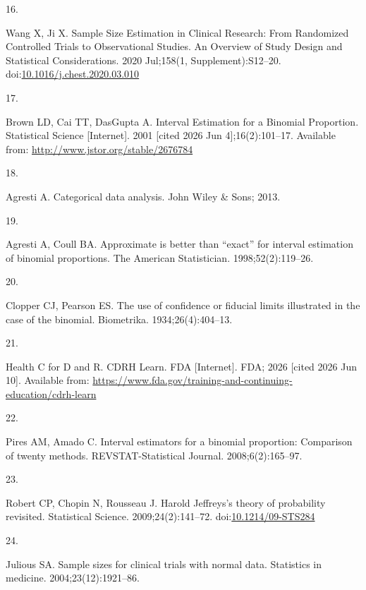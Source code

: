 \documentclass{article}
\newlength{\cslhangindent}
\newlength{\csllabelwidth}
\newenvironment{CSLReferences}[2] %
 {\begin{list}{}{%
  \setlength{\itemindent}{0pt}
  \setlength{\leftmargin}{0pt}
  \setlength{\parsep}{0pt}
  \ifodd #1
   \setlength{\leftmargin}{\cslhangindent}
   \setlength{\itemindent}{-1\cslhangindent}
  \fi
  \setlength{\itemsep}{#2\baselineskip}}}
 {\end{list}}
\newcommand{\CSLLeftMargin}[1]{\parbox[t]{\csllabelwidth}{#1}}
\newcommand{\CSLRightInline}[1]{\parbox[t]{\linewidth - \csllabelwidth}{#1}\break}
\begin{document}
\begin{CSLReferences}{0}{1}
\CSLLeftMargin{16. }%
\CSLRightInline{Wang X, Ji X. Sample {Size} {Estimation} in {Clinical}
{Research}: {From} {Randomized} {Controlled} {Trials} to {Observational}
{Studies}. An Overview of Study Design and Statistical Considerations.
2020 Jul;158(1, Supplement):S12--20.
doi:\href{https://doi.org/10.1016/j.chest.2020.03.010}{10.1016/j.chest.2020.03.010}}

\CSLLeftMargin{17. }%
\CSLRightInline{Brown LD, Cai TT, DasGupta A. Interval {Estimation} for
a {Binomial} {Proportion}. Statistical Science {[}Internet{]}. 2001
{[}cited 2026 Jun 4{]};16(2):101--17. Available from:
\url{http://www.jstor.org/stable/2676784}}

\CSLLeftMargin{18. }%
\CSLRightInline{Agresti A. Categorical data analysis. John Wiley \&
Sons; 2013.}

\CSLLeftMargin{19. }%
\CSLRightInline{Agresti A, Coull BA. Approximate is better than
{``exact''} for interval estimation of binomial proportions. The
American Statistician. 1998;52(2):119--26.}

\CSLLeftMargin{20. }%
\CSLRightInline{Clopper CJ, Pearson ES. The use of confidence or
fiducial limits illustrated in the case of the binomial. Biometrika.
1934;26(4):404--13.}

\CSLLeftMargin{21. }%
\CSLRightInline{Health C for D and R. {CDRH} {Learn}. FDA
{[}Internet{]}. FDA; 2026 {[}cited 2026 Jun 10{]}. Available from:
\url{https://www.fda.gov/training-and-continuing-education/cdrh-learn}}

\CSLLeftMargin{22. }%
\CSLRightInline{Pires AM, Amado C. Interval estimators for a binomial
proportion: {Comparison} of twenty methods. REVSTAT-Statistical Journal.
2008;6(2):165--97.}

\CSLLeftMargin{23. }%
\CSLRightInline{Robert CP, Chopin N, Rousseau J. Harold {Jeffreys}'s
theory of probability revisited. Statistical Science.
2009;24(2):141--72.
doi:\href{https://doi.org/10.1214/09-STS284}{10.1214/09-STS284}}

\CSLLeftMargin{24. }%
\CSLRightInline{Julious SA. Sample sizes for clinical trials with normal
data. Statistics in medicine. 2004;23(12):1921--86.}


\end{CSLReferences}
\end{document}
